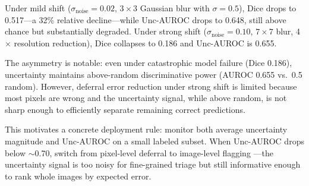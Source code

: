 Under mild shift ($\sigma_{\text{noise}} = 0.02$, $3\times3$ Gaussian blur
with $\sigma = 0.5$), Dice drops to 0.517---a 32\% relative decline---while
Unc-AUROC drops to 0.648, still above chance but substantially degraded.
Under strong shift ($\sigma_{\text{noise}} = 0.10$, $7\times7$ blur,
4$\times$ resolution reduction), Dice collapses to 0.186 and Unc-AUROC is
0.655.

The asymmetry is notable: even under catastrophic model failure (Dice 0.186),
uncertainty maintains above-random discriminative power (AUROC 0.655 vs.\
0.5 random). However, deferral error reduction under strong shift is limited
because most pixels are wrong and the uncertainty signal, while above random,
is not sharp enough to efficiently separate remaining correct predictions.

This motivates a concrete deployment rule: monitor both average uncertainty
magnitude and Unc-AUROC on a small labeled subset. When Unc-AUROC drops
below $\sim$0.70, switch from pixel-level deferral to image-level flagging
---the uncertainty signal is too noisy for fine-grained triage but still
informative enough to rank whole images by expected error.

